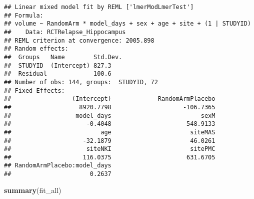 \documentclass[]{article}
\newenvironment{Shaded}{\begin{snugshade}}{\end{snugshade}}
\newcommand{\KeywordTok}[1]{\textcolor[rgb]{0.13,0.29,0.53}{\textbf{#1}}}
\newcommand{\NormalTok}[1]{#1}
\theoremstyle{definition}
\theoremstyle{definition}
\theoremstyle{definition}
\theoremstyle{remark}
\begin{document}
\begin{verbatim}
## Linear mixed model fit by REML ['lmerModLmerTest']
## Formula: 
## volume ~ RandomArm * model_days + sex + age + site + (1 | STUDYID)
##    Data: RCTRelapse_Hippocampus
## REML criterion at convergence: 2005.898
## Random effects:
##  Groups   Name        Std.Dev.
##  STUDYID  (Intercept) 827.3   
##  Residual             100.6   
## Number of obs: 144, groups:  STUDYID, 72
## Fixed Effects:
##                 (Intercept)             RandomArmPlacebo  
##                   8920.7798                    -106.7365  
##                  model_days                         sexM  
##                     -0.4048                     548.9133  
##                         age                      siteMAS  
##                    -32.1879                      46.0261  
##                     siteNKI                      sitePMC  
##                    116.0375                     631.6705  
## RandomArmPlacebo:model_days  
##                      0.2637
\end{verbatim}

\begin{Shaded}
\begin{Highlighting}[]
  \KeywordTok{summary}\NormalTok{(fit_all)}
\end{Highlighting}
\end{Shaded}
\end{document}
